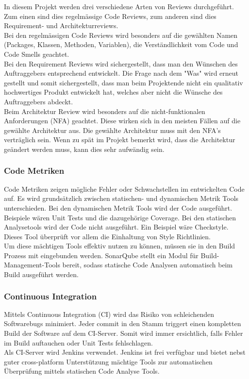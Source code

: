 \documentclass[a4,12pt]{scrartcl}
\begin{document}
\noindent In diesem Projekt werden drei verschiedene Arten von Reviews durchgeführt. Zum einen sind dies regelmässige Code Reviews, zum anderen sind dies Requirement- und Architekturreviews.\\

\noindent Bei den regelmässigen Code Reviews wird besonders auf die gewählten Namen (Packages, Klassen, Methoden, Variablen), die Verständlichkeit vom Code und Code Smells geachtet.\\

\noindent Bei den Requirement Reviews wird sichergestellt, dass man den Wünschen des Auftraggebers entsprechend entwickelt. Die Frage nach dem "Was" wird erneut gestellt und somit sichergestellt, dass man beim Projektende nicht ein qualitativ hochwertiges Produkt entwickelt hat, welches aber nicht die Wünsche des Auftraggebers abdeckt.\\ 

\noindent Beim Architektur Review wird besonders auf die nicht-funktionalen Anforderungen (NFA) geachtet. Diese wirken sich in den meisten Fällen auf die gewählte Architektur aus. Die gewählte Architektur muss mit den NFA's verträglich sein. Wenn zu spät im Projekt bemerkt wird, dass die Architektur geändert werden muss, kann dies sehr aufwändig sein.
\subsubsection{Code Metriken}
Code Metriken zeigen mögliche Fehler oder Schwachstellen im entwickelten Code auf. Es wird grundsätzlich zwischen statischen- und dynamischen Metrik Tools unterschieden. Bei den dynamischen Metrik Tools wird der Code ausgeführt. Beispiele wären Unit Tests und die dazugehörige Coverage. Bei den statischen Analysetools wird der Code nicht ausgeführt. Ein Beispiel wäre Checkstyle. Dieses Tool überprüft vor allem die Einhaltung von Style Richtlinien.\\

\noindent Um diese mächtigen Tools effektiv nutzen zu können, müssen sie in den Build Prozess mit eingebunden werden. SonarQube stellt ein Modul für Build-Management-Tools bereit, sodass statische Code Analysen automatisch beim Build ausgeführt werden.
\subsubsection{Continuous Integration}
Mittels Continuous Integration (CI) wird das Risiko von schleichenden Softwarebugs minimiert. Jeder commit in den Stamm triggert einen kompletten Build der Software auf dem CI-Server. Somit wird immer ersichtlich, falls Fehler im Build auftauchen oder Unit Tests fehlschlagen.\\

\noindent Als CI-Server wird Jenkins verwendet. Jenkins ist frei verfügbar und bietet nebst guter cross-platform Unterstützung mächtige Tools zur automatischen Überprüfung mittels statischen Code Analyse Tools.
\end{document}
